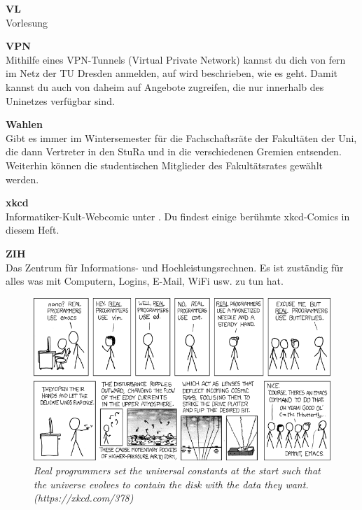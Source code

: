 \begin{multicols}{2}
\textbf{VL} \\
Vorlesung

\textbf{VPN}\\
Mithilfe eines VPN-Tunnels (Virtual Private Network) kannst du dich von fern im Netz der TU Dresden anmelden, auf  wird beschrieben, wie es geht.
Damit kannst du auch von daheim auf Angebote zugreifen, die nur innerhalb des Uninetzes verfügbar sind. 

\vfill\columnbreak

\textbf{Wahlen} \\
Gibt es immer im Wintersemester für die Fachschaftsräte der Fakultäten der Uni, die dann Vertreter in den StuRa und in die verschiedenen Gremien entsenden.
Weiterhin können die studentischen Mitglieder des Fakultätsrates gewählt werden.

\vfill\columnbreak

\textbf{xkcd} \\
Informatiker-Kult-Webcomic unter . Du findest einige berühmte xkcd-Comics in diesem Heft.

\textbf{ZIH} \\
Das Zentrum für Informations- und Hochleistungsrechnen.
Es ist zuständig für alles was mit Computern, Logins, E-Mail, WiFi usw. zu tun hat.

\end{multicols}

\vfill
\begin{figure}[h!]
\centering
\includegraphics[width=\linewidth]{img/xkcd/real_programmers.png}
\caption*{{\small \textit{Real programmers set the universal constants at the start such that the universe evolves to contain the disk with the data they want. (https://xkcd.com/378)}}}
\end{figure}
